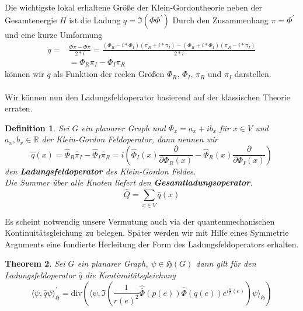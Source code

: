 \documentclass[11pt,a4paper,leqno]{report}
\newtheorem{theorem}{Theorem}[chapter]
\newtheorem{definition}[theorem]{Definition}
\numberwithin{equation}{chapter}
\begin{document}
\noindent
Die wichtigste lokal erhaltene Gr\"o\ss{}e der Klein-Gordontheorie neben der Gesamtenergie $H$ ist die Ladung $q=\Im(\overline{\Phi}\Phi^\prime)$
Durch den Zusammenhang $\pi = \Phi^\prime$ und eine kurze Umformung
\begin{align*}
	q=&\frac{\overline{\Phi}\pi - \Phi\overline{\pi}}{2*i}=
	\frac{(\Phi_R - i*\Phi_I)(\pi_R + i * \pi_I) - (\Phi_R + i*\Phi_I)(\pi_R - i * \pi_I)}{2*i}\\
	&=\Phi_R\pi_I-\Phi_I\pi_R
\end{align*} 
k\"onnen wir $q$ als Funktion der reelen Gr\"o\ss{}en $\Phi_R$, $\Phi_I$, $\pi_R$ und $\pi_I$ darstellen.\\
\\
Wir k\"onnen nun den Ladungsfeldoperator basierend auf der klassischen Theorie erraten.
\begin{definition}
	Sei $G$ ein planarer Graph und $\Phi_x = a_x + i b_x$ f\"ur $x\in V$ und $a_x, b_x\in\mathbb{R}$ der Klein-Gordon Feldoperator, dann nennen wir 
	\begin{equation}
		\hat{q}(x)=\hat{\Phi}_R\hat{\pi}_I-\hat{\Phi}_I\hat{\pi}_R=i(\hat{\Phi}_{I}(x)\frac{\partial}{\partial \Phi_{R}(x)}- \hat{\Phi}_{R}(x)\frac{\partial}{\partial \Phi_{I}(x)})
	\end{equation}
	den \textbf{Ladungsfeldoperator} des Klein-Gordon Feldes.\\
	Die Summer \"uber alle Knoten liefert den \textbf{Gesamtladungsoperator}.
	\begin{equation}
		\hat{Q} = \sum_{x\in V} \hat{q}(x)
	\end{equation} 
\end{definition}
\noindent
Es scheint notwendig unsere Vermutung auch via der quantenmechanischen Kontinuit\"atsgleichung zu belegen. Sp\"ater werden wir mit Hilfe eines Symmetrie Arguments eine fundierte Herleitung der Form des Ladungsfeldoperators erhalten.
\begin{theorem}
	Sei $G$ ein planarer Graph, $\psi\in\mathfrak{H}(G)$ dann gilt f\"ur den Ladungsfeldoperator $\hat{q}$ die Kontinuit\"atsgleichung
	\begin{equation}
		\langle \psi, \hat{q}\psi\rangle_\mathfrak{H}^\prime = \text{div}(\langle \psi,\Im(\frac{1}{r(e)^2} \hat{\overline{\Phi}}(p(e))\hat{\Phi}(q(e))e^{i\frac{a}{r}(e)}) \psi\rangle_\mathfrak{H})
	\end{equation}
\end{theorem}
\end{document}
